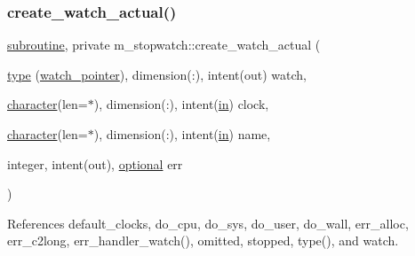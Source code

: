 \subsubsection{\texorpdfstring{create\+\_\+watch\+\_\+actual()}{create\_watch\_actual()}}
{\footnotesize\ttfamily \hyperlink{M__stopwatch_83_8txt_acfbcff50169d691ff02d4a123ed70482}{subroutine}, private m\+\_\+stopwatch\+::create\+\_\+watch\+\_\+actual (\begin{DoxyParamCaption}\item[{\hyperlink{stop__watch_83_8txt_a70f0ead91c32e25323c03265aa302c1c}{type} (\hyperlink{structm__stopwatch_1_1watch__pointer}{watch\+\_\+pointer}), dimension(\+:), intent(out)}]{watch,  }\item[{\hyperlink{option__stopwatch_83_8txt_abd4b21fbbd175834027b5224bfe97e66}{character}(len=$\ast$), dimension(\+:), intent(\hyperlink{M__journal_83_8txt_afce72651d1eed785a2132bee863b2f38}{in})}]{clock,  }\item[{\hyperlink{option__stopwatch_83_8txt_abd4b21fbbd175834027b5224bfe97e66}{character}(len=$\ast$), dimension(\+:), intent(\hyperlink{M__journal_83_8txt_afce72651d1eed785a2132bee863b2f38}{in})}]{name,  }\item[{integer, intent(out), \hyperlink{option__stopwatch_83_8txt_aa4ece75e7acf58a4843f70fe18c3ade5}{optional}}]{err }\end{DoxyParamCaption})\hspace{0.3cm}{\ttfamily [private]}}



References default\+\_\+clocks, do\+\_\+cpu, do\+\_\+sys, do\+\_\+user, do\+\_\+wall, err\+\_\+alloc, err\+\_\+c2long, err\+\_\+handler\+\_\+watch(), omitted, stopped, type(), and watch.

